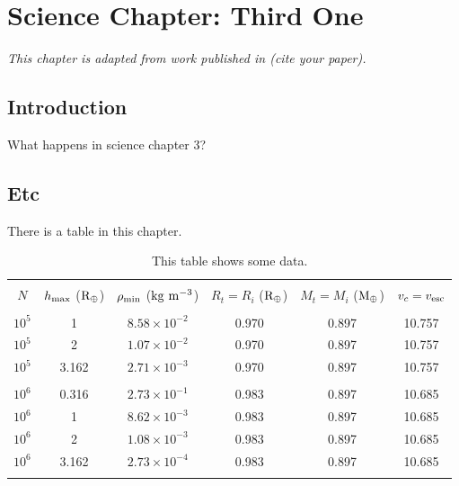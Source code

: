 \chapter{Science Chapter: Third One}
\label{chapter:science3}

\begin{center}
    \textit{This chapter is adapted from work published in (cite your paper).}
\end{center}

\section{Introduction}
What happens in science chapter 3?

\section{Etc}
There is a table in this chapter.

\begin{table}
    \centering
    \begin{tabular}{cccccc} %
        \hline \vspace{-1em} \\
	{$N$} & $h_{\rm max}$ ($\rm R_{\oplus}$) & $\rho_{\rm min}$ ($\rm{kg \ m^{-3}}$) & $R_t = R_i$ ($\rm R_{\oplus}$) & $M_t = M_i$ ($\rm M_{ \oplus}$) & $v_c = v_{\rm esc}$ \\
    
    \hline \vspace{-0.75em}
    \\
    $10^5$ & 1 & $8.58 \times 10^{-2}$ & 0.970 & 0.897 & 10.757 \\
    $10^5$ & 2 & $1.07 \times 10^{-2}$ & 0.970 & 0.897 & 10.757 \\
    $10^5$ & 3.162 & $2.71 \times 10^{-3}$ & 0.970 & 0.897 & 10.757 \\
    
    \vspace{-0.5em} \\ 
	$10^6$ & 0.316 & $2.73 \times 10^{-1}$ & 0.983 & 0.897 & 10.685 \\
    $10^6$ & 1 & $8.62 \times 10^{-3}$ & 0.983 & 0.897 & 10.685 \\
    $10^6$ & 2 & $1.08 \times 10^{-3}$ & 0.983 & 0.897 & 10.685 \\
    $10^6$ & 3.162 & $2.73 \times 10^{-4}$ & 0.983 & 0.897 & 10.685  \\
    
    
    \\ \hline \hline
    \end{tabular}
    \caption[Table Name in List of Tables]{This table shows some data.}
    \label{tab:data}
\end{table}